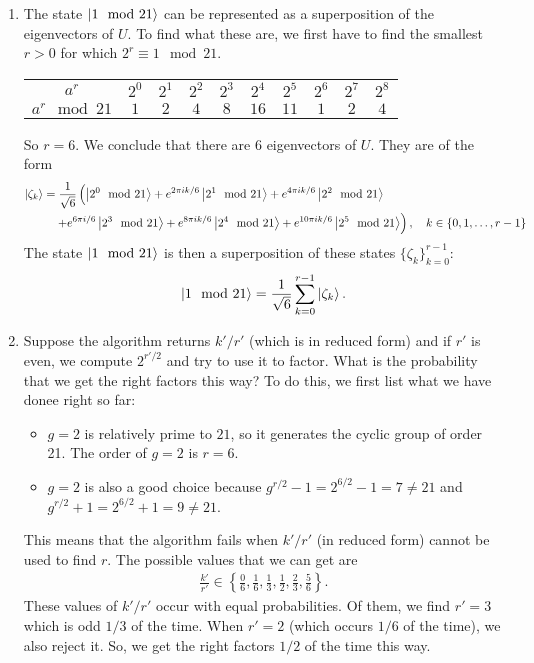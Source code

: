 \documentclass{article}
\theoremstyle{definition}
\newcommand{\f}[2]{\frac{#1}{#2}}
\newcommand{\lp}{\left(}
\newcommand{\rp}{\right)}
\newcommand{\lc}{\left\{}
\newcommand{\rc}{\right\}}
\begin{document}
\begin{enumerate}[label=(\alph*)]

\item The state $\ket{1 \mod 21}$ can be represented as a superposition of the  eigenvectors of $U$. To find what these are, we first have to find the smallest $r > 0$ for which $2^r \equiv 1 \mod 21$. 

\begin{center}
\begin{tabular}{ c | c  c  c c  c c c c c} 
 $a^r$  & $2^0$ & $2^1$ & $2^2$ & $2^3$ & $2^4$ & $2^5$  & $2^6$ & $2^7$ & $2^8$ \\ 
 $a^r \mod 21$  & $1$ & $2$ & $4$ & $8$ & $16$ & $11$  & $1$ & $2$ & $4$ \\ 
\end{tabular}
\end{center}

So $r = 6$. We conclude that there are $\boxed{6}$ eigenvectors of $U$. They are of the form
\begin{align*}
\ket{\zeta_k} &= \f{1}{\sqrt{6}} \lp \ket{2^0 \mod 21} + e^{2\pi i k/6} \ket{2^1 \mod 21}  +  e^{4\pi i k/6}\ket{2^2 \mod 21} \right. \\
&\left. \quad + e^{6\pi i /6} \ket{2^3 \mod 21} +  e^{8 \pi i k/6 }\ket{2^4 \mod 21} + e^{10 \pi i k/6} \ket{2^5\mod 21} \rp, \quad k \in \{ 0,1,\dots, r-1\}
\end{align*}  
The state $\ket{1\mod 21}$ is then a  superposition of these states $\{ \zeta_k \}_{k=0}^{r-1} $:
\begin{align*}
\ket{1\mod 21} =  \f{1}{\sqrt{6}} \sum_{k=0}^{r-1}  \ket{\zeta_{k}}.
\end{align*}


\item Suppose the algorithm returns $k'/r'$ (which is in reduced form) and if $r'$ is even, we compute $2^{r'/2}$ and try to use it to factor. What is the probability that we get the right factors this way? To do this, we first list what we have donee right so far:
\begin{itemize}
\item $g=2$ is relatively prime to $21$, so it generates the cyclic group of order 21. The order of $g=2$ is $r=6$.

\item $g=2$ is also a good choice because $g^{r/2} - 1 = 2^{6/2}-1 = 7 \neq 21$ and $g^{r/2} + 1 = 2^{6/2}+1 = 9 \neq 21$. 
\end{itemize}
This means that the algorithm fails when $k'/r'$ (in reduced form) cannot be used to find $r$. The possible values that we can get are
\begin{align*}
\f{k'}{r'} \in \lc \f{0}{6}, \f{1}{6}, \f{1}{3}, \f{1}{2}, \f{2}{3}, \f{5}{6} \rc.
\end{align*}
These values of $k'/r'$ occur with equal probabilities. Of them, we find $r' = 3$ which is odd $1/3$ of the time. When $r'=2$ (which occurs $1/6$ of the time), we also reject it. So, we get the right factors $\boxed{1/2}$ of the time this way.

\end{enumerate}
\end{document}
